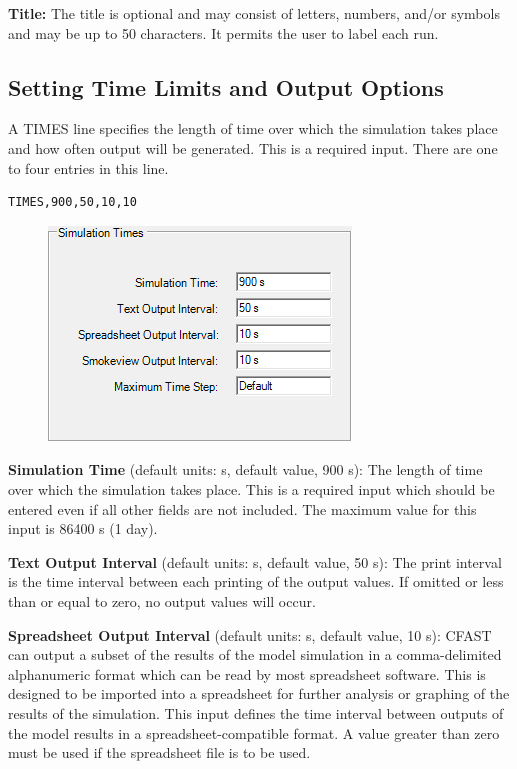 \textbf{Title:} The title is optional and may consist of letters, numbers, and/or symbols and may be up to 50 characters. It permits the user to label each run.

\subsection{Setting Time Limits and Output Options}

A TIMES line specifies the length of time over which the simulation takes place and how often output will be generated. This is a required input. There are one to four entries in this line.

\begin{lstlisting}
TIMES,900,50,10,10
\end{lstlisting}

\begin{figure}[h!]
\begin{center}
\includegraphics[width=3.167in]{FIGURES/Input_File/Simulation_Times}
\end{center}
\end{figure}


\textbf{Simulation Time} (default units: s, default value, 900 s): The length of time over which the simulation takes place.  This is a required input which should be entered even if all other fields are not included. The maximum value for this input is 86400 s (1 day).

\textbf{Text Output Interval} (default units: s, default value, 50 s): The print interval is the time interval between each printing of the output values.  If omitted or less than or equal to zero, no output values will occur.

\textbf{Spreadsheet Output Interval} (default units: s, default value, 10 s): CFAST can output a subset of the results of the model simulation in a comma-delimited alphanumeric format which can be read by most spreadsheet software. This is designed to be imported into a spreadsheet for further analysis or graphing of the results of the simulation.  This input defines the time interval between outputs of the model results in a spreadsheet-compatible format. A value greater than zero must be used if the spreadsheet file is to be used.

